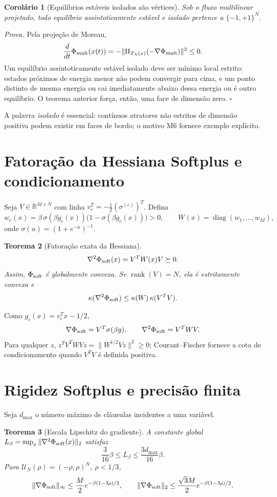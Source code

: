 \documentclass[11pt,a4paper]{article}
\newtheorem{theorem}{Teorema}[section]
\newtheorem{corollary}[theorem]{Corolário}
\newcommand{\X}{\mathcal X}
\begin{document}
\begin{corollary}[Equilíbrios estáveis isolados são vértices]
Sob o fluxo multilinear projetado, todo equilíbrio assintoticamente estável e isolado pertence a $\{-1,+1\}^N$.
\end{corollary}

\noindent\textit{Prova.} Pela projeção de Moreau,
\[
\frac{d}{dt}\Phi_{\rm mult}(x(t))=-\|\Pi_{T_\X(x)}(-\nabla\Phi_{\rm mult})\|^2\le0.
\]
Um equilíbrio assintoticamente estável isolado deve ser mínimo local estrito: estados próximos de energia menor não podem convergir para cima, e um ponto distinto de mesma energia ou cai imediatamente abaixo dessa energia ou é outro equilíbrio. O teorema anterior força, então, uma face de dimensão zero. \hfill$\square$

A palavra \emph{isolado} é essencial: contínuos atratores não estritos de dimensão positiva podem existir em faces de bordo; o motivo M6 fornece exemplo explícito.

\section{Fatoração da Hessiana Softplus e condicionamento}\label{sec:soft}
Seja $V\in\mathbb R^{M\times N}$ com linha $v_c^T=-\frac12(\sigma^{(c)})^T$. Defina
\[
w_c(x)=\beta\,\sigma(\beta g_c(x))\bigl(1-\sigma(\beta g_c(x))\bigr)>0,\qquad W(x)=\operatorname{diag}(w_1,\ldots,w_M),
\]
onde $\sigma(u)=(1+e^{-u})^{-1}$.

\begin{theorem}[Fatoração exata da Hessiana]
\[
\nabla^2\Phi_{\rm soft}(x)=V^TW(x)V\succeq0.
\]
Assim, $\Phi_{\rm soft}$ é globalmente convexa. Se $\operatorname{rank}(V)=N$, ela é estritamente convexa e
\[
\kappa(\nabla^2\Phi_{\rm soft})\le\kappa(W)\,\kappa(V^TV).
\]
\end{theorem}

\noindent Como $g_c(x)=v_c^Tx-1/2$,
\[
\nabla\Phi_{\rm soft}=V^T\sigma(\beta g),\qquad \nabla^2\Phi_{\rm soft}=V^TWV.
\]
Para qualquer $z$, $z^TV^TWVz=\|W^{1/2}Vz\|^2\ge0$; Courant--Fischer fornece a cota de condicionamento quando $V^TV$ é definida positiva.

\section{Rigidez Softplus e precisão finita}
Seja $d_{\max}$ o número máximo de cláusulas incidentes a uma variável.

\begin{theorem}[Escala Lipschitz do gradiente]
A constante global $L_\beta=\sup_x\|\nabla^2\Phi_{\rm soft}(x)\|_2$ satisfaz
\[
\frac3{16}\beta\le L_\beta\le\frac{3d_{\max}}{16}\beta.
\]
Para $\mathcal U_N(\rho)=(-\rho,\rho)^N$, $\rho<1/3$,
\[
\|\nabla\Phi_{\rm soft}\|_\infty\le\frac M2e^{-\beta(1-3\rho)/2},\qquad
\|\nabla\Phi_{\rm soft}\|_2\le\frac{\sqrt3M}{2}e^{-\beta(1-3\rho)/2}.
\]
\end{theorem}
\end{document}
